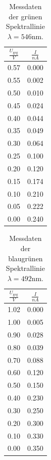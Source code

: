 \documentclass[
  bibliography=totoc,     %
  captions=tableheading,  %
  titlepage=firstiscover, %
]{scrartcl}
\begin{document}
\begin{table}[H]
\centering
	\label{tab:grün}
	\caption{Messdaten der grünen Spektrallinie $\lambda = 546 \text{nm}$.}
	\begin{tabular}{c|c}
		\toprule
		{$\frac{U_\text{geg}}{V}$}&{$\frac{I}{nA}$} \\
		\hline
        \midrule
        0.57 &0.000\\
	0.55 &0.002\\
	0.50 &0.010\\
	0.45 &0.024\\
	0.40 &0.044\\
	0.35 &0.049\\
	0.30 &0.064\\
	0.25 &0.100\\
	0.20 &0.120\\
	0.15 &0.174\\
	0.10 &0.210\\
	0.05 &0.222\\
	0.00 &0.240\\
        	\bottomrule 
	\end{tabular}
\end{table}
\begin{table}
\centering
	\label{tab:blaugrün}
	\caption{Messdaten der blaugrünen Spektrallinie $\lambda = 492 \text{nm}$.}
	\begin{tabular}{c|c}
		\toprule
		{$\frac{U_\text{geg}}{V}$}&{$\frac{I}{nA}$} \\
		\hline
        \midrule
        1.02 &0.000\\
	1.00 &0.005\\
	0.90 &0.028\\
	0.80 &0.039\\
	0.70 &0.088\\
	0.60 &0.120\\
	0.50 &0.150\\
	0.40 &0.230\\
	0.30 &0.250\\
	0.20 &0.300\\
	0.10 &0.330\\
	0.00 &0.350\\
	\bottomrule 
	\end{tabular}
\end{table}
\end{document}
